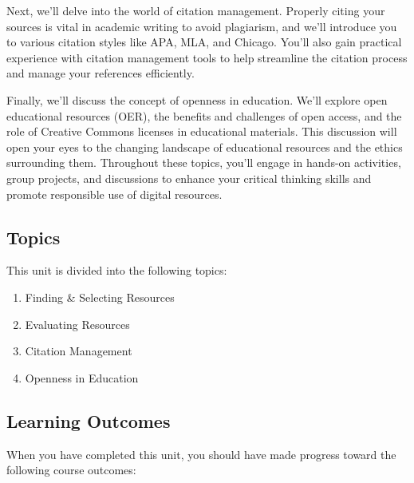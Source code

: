 \documentclass[
]{book}
\providecommand{\tightlist}{%
  \setlength{\itemsep}{0pt}\setlength{\parskip}{0pt}}
\theoremstyle{definition}
\theoremstyle{definition}
\theoremstyle{definition}
\theoremstyle{definition}
\theoremstyle{remark}
\begin{document}
Next, we'll delve into the world of citation management. Properly citing your sources is vital in academic writing to avoid plagiarism, and we'll introduce you to various citation styles like APA, MLA, and Chicago. You'll also gain practical experience with citation management tools to help streamline the citation process and manage your references efficiently.

Finally, we'll discuss the concept of openness in education. We'll explore open educational resources (OER), the benefits and challenges of open access, and the role of Creative Commons licenses in educational materials. This discussion will open your eyes to the changing landscape of educational resources and the ethics surrounding them. Throughout these topics, you'll engage in hands-on activities, group projects, and discussions to enhance your critical thinking skills and promote responsible use of digital resources.

\hypertarget{topics-1}{%
\subsection*{Topics}\label{topics-1}}

This unit is divided into the following topics:

\begin{enumerate}
\def\labelenumi{\arabic{enumi}.}
\tightlist
\item
  Finding \& Selecting Resources\\
\item
  Evaluating Resources
\item
  Citation Management\\
\item
  Openness in Education
\end{enumerate}

\hypertarget{learning-outcomes-1}{%
\subsection*{Learning Outcomes}\label{learning-outcomes-1}}

When you have completed this unit, you should have made progress toward the following course outcomes:
\end{document}
